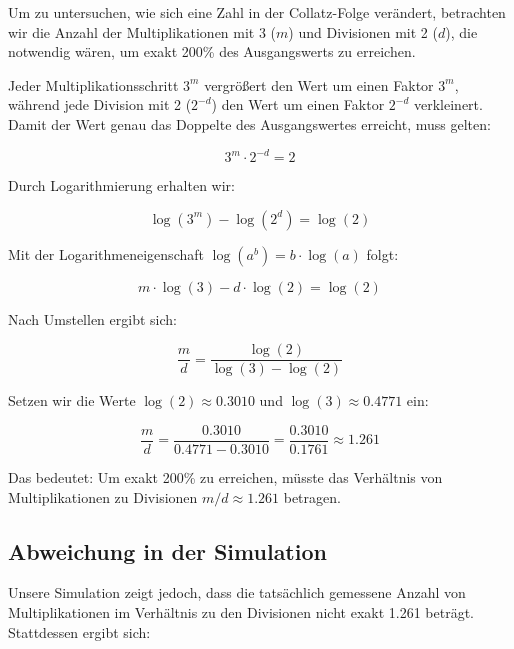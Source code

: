\documentclass[a4paper,12pt]{article}
\begin{document}
Um zu untersuchen, wie sich eine Zahl in der Collatz-Folge verändert, betrachten wir die Anzahl der Multiplikationen mit 3 (\( m \)) und Divisionen mit 2 (\( d \)), die notwendig wären, um exakt 200\% des Ausgangswerts zu erreichen.  

Jeder Multiplikationsschritt \( 3^m \) vergrößert den Wert um einen Faktor \( 3^m \), während jede Division mit 2 (\( 2^{-d} \)) den Wert um einen Faktor \( 2^{-d} \) verkleinert. Damit der Wert genau das Doppelte des Ausgangswertes erreicht, muss gelten:  

\begin{equation}
    3^m \cdot 2^{-d} = 2
\end{equation}

Durch Logarithmierung erhalten wir:

\begin{equation}
    \log(3^m) - \log(2^d) = \log(2)
\end{equation}

Mit der Logarithmeneigenschaft \( \log(a^b) = b \cdot \log(a) \) folgt:

\begin{equation}
    m \cdot \log(3) - d \cdot \log(2) = \log(2)
\end{equation}

Nach Umstellen ergibt sich:

\begin{equation}
    \frac{m}{d} = \frac{\log(2)}{\log(3) - \log(2)}
\end{equation}

Setzen wir die Werte \( \log(2) \approx 0.3010 \) und \( \log(3) \approx 0.4771 \) ein:

\begin{equation}
    \frac{m}{d} = \frac{0.3010}{0.4771 - 0.3010} = \frac{0.3010}{0.1761} \approx 1.261
\end{equation}

Das bedeutet:  
Um exakt 200\% zu erreichen, müsste das Verhältnis von Multiplikationen zu Divisionen \( m/d \approx 1.261 \) betragen.  

\subsection{Abweichung in der Simulation}  

Unsere Simulation zeigt jedoch, dass die tatsächlich gemessene Anzahl von Multiplikationen im Verhältnis zu den Divisionen nicht exakt 1.261 beträgt. Stattdessen ergibt sich:
\end{document}
